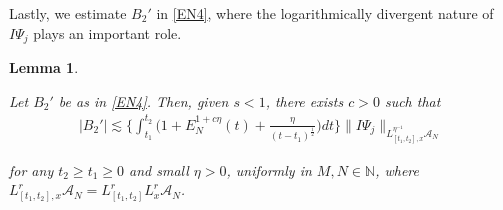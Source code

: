 \documentclass[letterpaper, 11pt,  reqno]{amsart}
\newtheorem{lemma}[theorem]{Lemma}
\newcommand{\1}{\hspace{0.5mm}\text{I}\hspace{0.2mm}}
\newcommand{\noi}{\noindent}
\newcommand{\N}{\mathbb{N}}
\newcommand{\les}{\lesssim}
\newcommand{\A}{\mathcal{A}}
\newcommand{\EN}{E_N}
\numberwithin{equation}{section}
\numberwithin{theorem}{section}
\begin{document}
Lastly, we 
estimate $B_2'$
in \eqref{EN4}, 
where the logarithmically divergent nature
of $ I \Psi_j $ plays an important role.

\begin{lemma} 
\label{LEM:com6}  

Let $B_2'$ be as in \eqref{EN4}.
Then, given $s < 1$, 
there exists $c > 0$ such that 
\begin{align} 
\label{EN9}
| B_2' | \les 
\bigg\{\int_{t_1}^{t_2} 
\Big(1 + 
 \EN^{1 + c\eta} (t)+ \frac {\eta}{(t - t_1)^{\frac 12}} \Big)  d t\bigg\}
\| I \Psi_j \|_{L^{\eta^{-1}}_{[t_1, t_2], x} \A_N } 
\end{align} 

\noi 
for any 
$t_2 \geq t_1 \geq 0$
and small $\eta > 0$, 
uniformly in 
$M, N \in \N$, 
where
$L^r_{[t_1, t_2], x}\A_N
= L^r_{[t_1, t_2]}L^r_x \A_N$.



\end{lemma}
\end{document}
